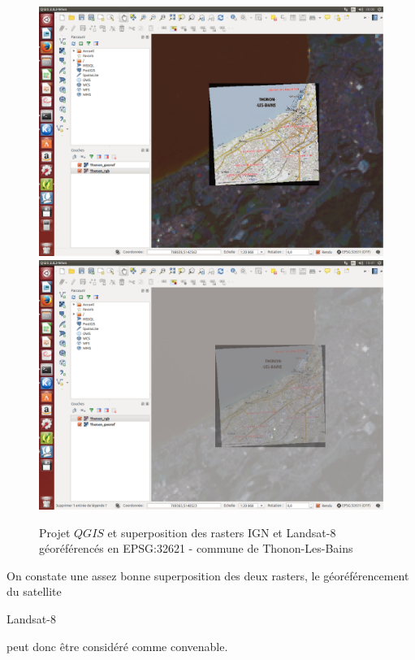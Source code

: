 \documentclass{book}
\begin{document}
\begin{figure}[H]
\begin{center}
\includegraphics[scale=0.3]{images/qgis-superposition0.png}
\includegraphics[scale=0.3]{images/qgis-superposition.png}
\end{center}
\caption{Projet $QGIS$ et superposition des rasters IGN et Landsat-8 géoréférencés en EPSG:32621 - commune de Thonon-Les-Bains}
\label{qgis_super}
\end{figure}

On constate une assez bonne superposition des deux rasters, le géoréférencement du satellite \begin{itshape}Landsat-8\end{itshape} peut
 donc \^{e}tre considéré comme convenable.
 
\clearpage

\backmatter

\listoftables

\listoffigures



\end{document}
